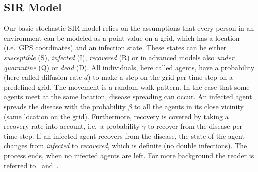 \subsection{SIR Model}
Our basic stochastic SIR model relies on the assumptions that every person in an environment can be modeled as a point value on a grid, which has a location (i.e.\ GPS coordinates) and an infection state. These states can be either \textit{susceptible} (S), \textit{infected} (I), \textit{recovered} (R) or in advanced models also \textit{under quarantine} (Q) or \textit{dead} (D). All individuals, here called agents, have a probability (here called diffusion rate $d$) to make a step on the grid per time step on a predefined grid. The movement is a random walk pattern. In the case that some agents meet at the same location, disease spreading can occur. An infected agent spreads the disease with the probability $\beta$ to all the agents in its close vicinity (same location on the grid). Furthermore, recovery is covered by taking a recovery rate into account, i.e.\ a probability $\gamma$ to recover from the disease per time step. If an infected agent recovers from the disease, the state of the agent changes from \textit{infected} to \textit{recovered}, which is definite (no double infections). The process ends, when no infected agents are left. For more background the reader is referred to~\cite{weiss2013sir} and~\cite{epstein2009modelling}.


